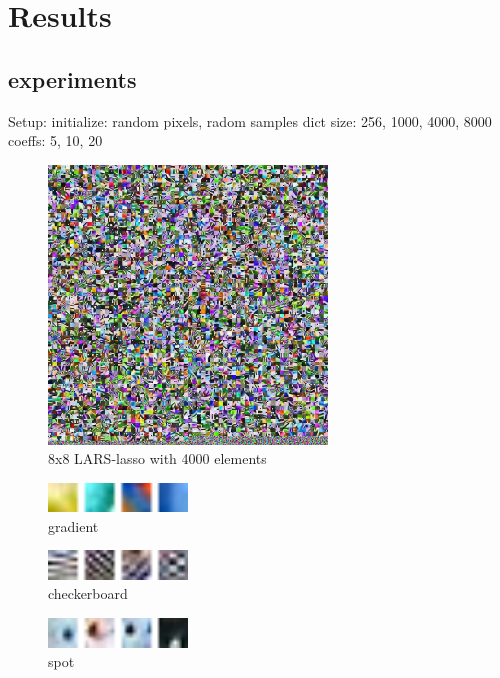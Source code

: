 \chapter{Results}
\section{experiments}
Setup:
  initialize: random pixels, radom samples 
  dict size: 256, 1000, 4000, 8000
  coeffs: 5, 10, 20


\begin{figure}
\centering
\includegraphics[width = 0.66\textwidth]{images/8_4000_10000_10_lasso.png} 
\caption{8x8 LARS-lasso with 4000 elements}
\label{fig:8_4000_lasso}
\end{figure}

\begin{figure}
\centering
\includegraphics[width = 0.33\textwidth]{images/gradient.png} 
\caption{gradient}
\label{fig:gradient}
\end{figure}

\begin{figure}
\centering
\includegraphics[width = 0.33\textwidth]{images/checkerboard.png}
\caption{checkerboard}
\label{fig:checkerboard}
\end{figure}


\begin{figure}
\centering
\includegraphics[width = 0.33\textwidth]{images/spot.png} 
\caption{spot}
\label{fig:spot}
\end{figure}


